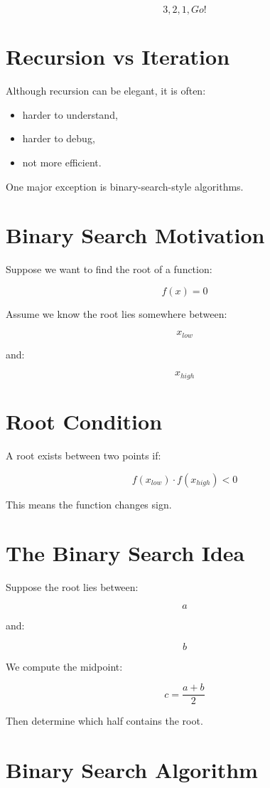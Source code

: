 \documentclass[11pt]{article}
\begin{document}
\[
3, 2, 1, Go!
\]

\section{Recursion vs Iteration}

Although recursion can be elegant, it is often:

\begin{itemize}
    \item harder to understand,
    \item harder to debug,
    \item not more efficient.
\end{itemize}

One major exception is binary-search-style algorithms.

\section{Binary Search Motivation}

Suppose we want to find the root of a function:

\[
f(x) = 0
\]

Assume we know the root lies somewhere between:

\[
x_{low}
\]

and:

\[
x_{high}
\]

\section{Root Condition}

A root exists between two points if:

\[
f(x_{low}) \cdot f(x_{high}) < 0
\]

This means the function changes sign.

\section{The Binary Search Idea}

Suppose the root lies between:

\[
a
\]

and:

\[
b
\]

We compute the midpoint:

\[
c = \frac{a+b}{2}
\]

Then determine which half contains the root.

\section{Binary Search Algorithm}
\end{document}
